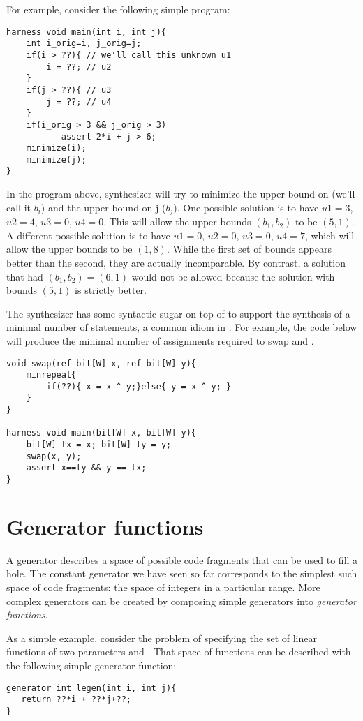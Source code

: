 \begin{Example}
For example, consider the following simple program: 

\begin{lstlisting}
harness void main(int i, int j){
	int i_orig=i, j_orig=j;
	if(i > ??){ // we'll call this unknown u1
		i = ??; // u2
	}
	if(j > ??){ // u3
		j = ??; // u4
	}
	if(i_orig > 3 && j_orig > 3)
    	   assert 2*i + j > 6;
	minimize(i);
	minimize(j);
}
\end{lstlisting}
In the program above, synthesizer will try to minimize the upper bound on  (we'll call it $b_i$) and the upper bound on j ($b_j$). One possible solution is to have $u1=3$, $u2=4$, $u3=0$, $u4=0$. This will allow the upper bounds $(b_1, b_2)$ to be $(5,1)$. A different possible solution is to have $u1=0$, $u2=0$, $u3=0$, $u4=7$, which will allow the upper bounds to be $(1, 8)$. While the first set of bounds appears better than the second, they are actually incomparable. By contrast, a solution that had $(b_1, b_2)=(6,1)$ would not be allowed because the solution with bounds $(5,1)$ is strictly better.
\end{Example}



The synthesizer has some syntactic sugar on top of  to support the synthesis of a minimal number of statements, a common idiom in \Sk{}. For example, the code below will produce the minimal number of assignments required to swap  and .
\begin{lstlisting}
void swap(ref bit[W] x, ref bit[W] y){
    minrepeat{
        if(??){ x = x ^ y;}else{ y = x ^ y; }
    }
}

harness void main(bit[W] x, bit[W] y){
    bit[W] tx = x; bit[W] ty = y;
    swap(x, y);
    assert x==ty && y == tx;
}
\end{lstlisting}


\section{Generator functions}
A generator describes a space of possible code fragments that can be used to fill a hole. The constant generator we have seen so far corresponds to the simplest such space of code fragments: the space of integers in a particular range. More complex generators can be created by composing simple generators into \emph{generator functions}. 

As a simple example, consider the problem of specifying the set of linear functions of two parameters  and . That space of functions can be described with the following simple generator function:
\begin{lstlisting}
generator int legen(int i, int j){
   return ??*i + ??*j+??;
}
\end{lstlisting}

